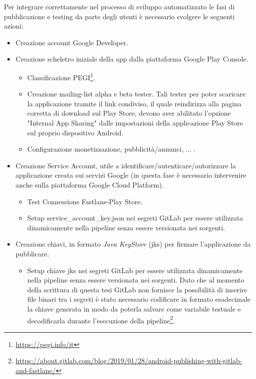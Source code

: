Per integrare correttamente nel processo di sviluppo automatizzato le fasi di pubblicazione e testing da parte degli utenti è necessario svolgere le seguenti azioni:
\begin{itemize}
    \item Creazione account Google Developer.
    \item Creazione scheletro iniziale della app dalla piattaforma Google Play Console.
    \begin{itemize}
        \item Classificazione PEGI\footnote{\url{https://pegi.info/it}}.
        \item Creazione mailing-list alpha e beta tester. Tali tester per poter scaricare la applicazione tramite il link condiviso, il quale reindirizza alla pagina corretta di download sul Play Store, devono aver abilitato l'opzione "Internal App Sharing" dalle impostazioni della applicazione Play Store sul proprio dispositivo Android.
        \item Configurazione monetizzazione, pubblicità/annunci, ... .
    \end{itemize}
    \item Creazione Service Account, utile a identificare/autenticare/autorizzare la applicazione creata sui servizi Google (in questa fase è necessario intervenire anche sulla piattaforma Google Cloud Platform).
    \begin{itemize}
        \item Test Connessione Fastlane-Play Store.
        \item Setup service\_account\_key.json nei segreti GitLab per essere utilizzata dinamicamente nella pipeline senza essere versionata nei sorgenti.
    \end{itemize}
    \item Creazione chiavi, in formato \textit{Java KeyStore} (jks) per firmare l'applicazione da pubblicare.
    \begin{itemize}
        \item Setup chiave jks nei segreti GitLab per essere utilizzata dinamicamente nella pipeline senza essere versionata nei sorgenti. Dato che al momento della scrittura di questa tesi GitLab non fornisce la possibilità di inserire file binari tra i segreti è stato necessario codificare in formato esadecimale la chiave generata in modo da poterla salvare come variabile testuale e decodificarla durante l'esecuzione della pipeline\footnote{\url{https://about.gitlab.com/blog/2019/01/28/android-publishing-with-gitlab-and-fastlane/}}.

\end{itemize}
\end{itemize}
